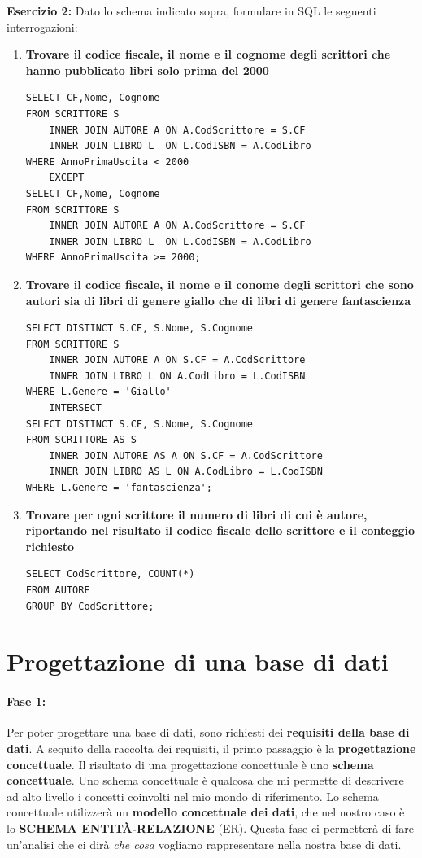 \documentclass{article}
\begin{document}
\textbf{Esercizio 2:} Dato lo schema indicato sopra, formulare in SQL le seguenti interrogazioni:
\begin{enumerate}
	\item \textbf{Trovare il codice fiscale, il nome e il cognome degli scrittori che hanno pubblicato libri solo prima del 2000}
		\begin{lstlisting}[style=sqlstyle]
SELECT CF,Nome, Cognome
FROM SCRITTORE S
	INNER JOIN AUTORE A ON A.CodScrittore = S.CF
	INNER JOIN LIBRO L	ON L.CodISBN = A.CodLibro
WHERE AnnoPrimaUscita < 2000
	EXCEPT
SELECT CF,Nome, Cognome
FROM SCRITTORE S
	INNER JOIN AUTORE A	ON A.CodScrittore = S.CF
	INNER JOIN LIBRO L	ON L.CodISBN = A.CodLibro
WHERE AnnoPrimaUscita >= 2000;
	\end{lstlisting}

	\item \textbf{Trovare il codice fiscale, il nome e il conome degli scrittori che sono autori sia di libri di genere giallo che di libri di genere fantascienza}
	
\begin{lstlisting}[style=sqlstyle]
SELECT DISTINCT S.CF, S.Nome, S.Cognome
FROM SCRITTORE S
	INNER JOIN AUTORE A ON S.CF = A.CodScrittore
	INNER JOIN LIBRO L ON A.CodLibro = L.CodISBN
WHERE L.Genere = 'Giallo'
	INTERSECT
SELECT DISTINCT S.CF, S.Nome, S.Cognome
FROM SCRITTORE AS S
	INNER JOIN AUTORE AS A ON S.CF = A.CodScrittore
	INNER JOIN LIBRO AS L ON A.CodLibro = L.CodISBN
WHERE L.Genere = 'fantascienza';
\end{lstlisting}
	
	\item \textbf{Trovare per ogni scrittore il numero di libri di cui è autore, riportando nel risultato il codice fiscale dello scrittore e il conteggio richiesto}
	\begin{lstlisting}[style=sqlstyle]
SELECT CodScrittore, COUNT(*)
FROM AUTORE
GROUP BY CodScrittore;
	\end{lstlisting}
\end{enumerate}

\newpage
\section{Progettazione di una base di dati}
\paragraph{Fase 1:} Per poter progettare una base di dati, sono richiesti dei \textbf{requisiti della base di dati}. A sequito della raccolta dei requisiti, il primo passaggio è la \textbf{progettazione concettuale}. Il risultato di una progettazione concettuale è uno \textbf{schema concettuale}. Uno schema concettuale è qualcosa che mi permette di descrivere ad alto livello i concetti coinvolti nel mio mondo di riferimento. Lo schema concettuale utilizzerà un \textbf{modello concettuale dei dati}, che nel nostro caso è lo \textbf{SCHEMA ENTITÀ-RELAZIONE} (ER). Questa fase ci permetterà di fare un'analisi che ci dirà \textit{che cosa} vogliamo rappresentare nella nostra base di dati.
\end{document}
